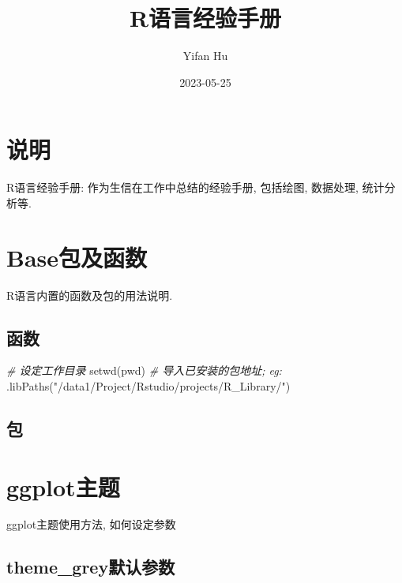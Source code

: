 \documentclass[
]{book}
\title{R语言经验手册}
\author{Yifan Hu}
\date{2023-05-25}
\newenvironment{Shaded}{\begin{snugshade}}{\end{snugshade}}
\newcommand{\CommentTok}[1]{\textcolor[rgb]{0.56,0.35,0.01}{\textit{#1}}}
\newcommand{\FunctionTok}[1]{\textcolor[rgb]{0.00,0.00,0.00}{#1}}
\newcommand{\NormalTok}[1]{#1}
\newcommand{\StringTok}[1]{\textcolor[rgb]{0.31,0.60,0.02}{#1}}
\begin{document}
\maketitle

{
\setcounter{tocdepth}{1}
\tableofcontents
}
\hypertarget{ux8bf4ux660e}{%
\chapter{说明}\label{ux8bf4ux660e}}

R语言经验手册: 作为生信在工作中总结的经验手册, 包括绘图, 数据处理, 统计分析等.

\hypertarget{baseux5305ux53caux51fdux6570}{%
\chapter{Base包及函数}\label{baseux5305ux53caux51fdux6570}}

R语言内置的函数及包的用法说明.

\hypertarget{ux51fdux6570}{%
\section{函数}\label{ux51fdux6570}}

\begin{Shaded}
\begin{Highlighting}[]
\CommentTok{\# 设定工作目录}
\FunctionTok{setwd}\NormalTok{(pwd)}
\CommentTok{\# 导入已安装的包地址; eg:}
\FunctionTok{.libPaths}\NormalTok{(}\StringTok{"/data1/Project/Rstudio/projects/R\_Library/"}\NormalTok{)}
\end{Highlighting}
\end{Shaded}

\hypertarget{ux5305}{%
\section{包}\label{ux5305}}

\hypertarget{ggplotux4e3bux9898}{%
\chapter{ggplot主题}\label{ggplotux4e3bux9898}}

ggplot主题使用方法, 如何设定参数

\hypertarget{theme_greyux9ed8ux8ba4ux53c2ux6570}{%
\section{theme\_grey默认参数}\label{theme_greyux9ed8ux8ba4ux53c2ux6570}}
\end{document}
